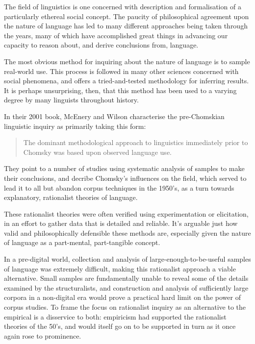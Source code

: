 

The field of linguistics is one concerned with description and formalisation of a particularly ethereal social concept.  The paucity of philosophical agreement upon the nature of language has led to many different approaches being taken through the years, many of which have accomplished great things in advancing our capacity to reason about, and derive conclusions from, language.


The most obvious method for inquiring about the nature of language is to sample real-world use.  This process is followed in many other sciences concerned with social phenomena, and offers a tried-and-tested methodology for inferring results.  It is perhaps unsurprising, then, that this method has been used to a varying degree by many linguists throughout history.

In their 2001 book\cite{mcenery2001corpus}, McEnery and Wilson characterise the pre-Chomskian linguistic inquiry as primarily taking this form:

\begin{quote}
The dominant methodological approach to linguistics immediately prior to Chomsky was based upon observed language use.
\end{quote}

They point to a number of studies using systematic analysis of samples to make their conclusions\cite{kaeding1897haufigkeitsworterbuch,preyer1889mind,stern1924psychology,eaton1940semantic,west1953general}, and decribe Chomsky's influences on the field, which served to lead it to all but abandon corpus techniques in the 1950's, as a turn towards explanatory, rationalist theories of language.

These rationalist theories were often verified using experimentation or elicitation, in an effort to gather data that is detailed and reliable.  It's arguable just how valid and philosophically defensible these methods are, especially given the nature of language as a part-mental, part-tangible concept.



In a pre-digital world, collection and analysis of large-enough-to-be-useful samples of language was extremely difficult, making this rationalist approach a viable alternative.
Small samples are fundamentally unable to reveal some of the details examined by the structuralists, and construction and analysis of sufficiently large corpora in a non-digital era would prove a practical hard limit on the power of corpus studies.  To frame the focus on rationalist inquiry as an alternative to the empirical is a disservice to both: empiricism had supported the rationalist theories of the 50's, and would itself go on to be supported in turn as it once again rose to prominence.

